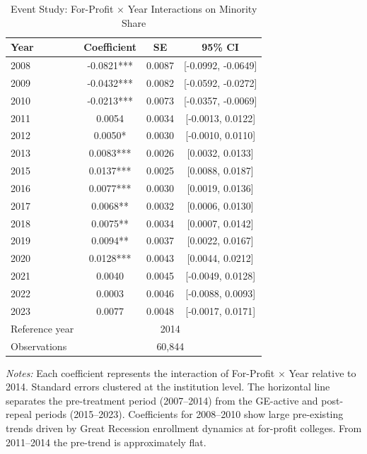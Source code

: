 \begin{table}[H]
\centering
\caption{Event Study: For-Profit $\times$ Year Interactions on Minority Share}
\label{tab:event}
\begin{threeparttable}
\begin{tabular}{lccc}
\toprule
Year & Coefficient & SE & 95\% CI \\
\midrule
2008 & -0.0821*** & 0.0087 & [-0.0992, -0.0649] \\
2009 & -0.0432*** & 0.0082 & [-0.0592, -0.0272] \\
2010 & -0.0213*** & 0.0073 & [-0.0357, -0.0069] \\
2011 & 0.0054 & 0.0034 & [-0.0013, 0.0122] \\
2012 & 0.0050* & 0.0030 & [-0.0010, 0.0110] \\
2013 & 0.0083*** & 0.0026 & [0.0032, 0.0133] \\
2015 & 0.0137*** & 0.0025 & [0.0088, 0.0187] \\ \hline
2016 & 0.0077*** & 0.0030 & [0.0019, 0.0136] \\
2017 & 0.0068** & 0.0032 & [0.0006, 0.0130] \\
2018 & 0.0075** & 0.0034 & [0.0007, 0.0142] \\
2019 & 0.0094** & 0.0037 & [0.0022, 0.0167] \\
2020 & 0.0128*** & 0.0043 & [0.0044, 0.0212] \\
2021 & 0.0040 & 0.0045 & [-0.0049, 0.0128] \\
2022 & 0.0003 & 0.0046 & [-0.0088, 0.0093] \\
2023 & 0.0077 & 0.0048 & [-0.0017, 0.0171] \\
\midrule
Reference year & \multicolumn{3}{c}{2014} \\
Observations & \multicolumn{3}{c}{60,844} \\
\bottomrule
\end{tabular}
\begin{tablenotes}[flushleft]
\small
\item \textit{Notes:} Each coefficient represents the interaction of For-Profit $\times$ Year relative to 2014. Standard errors clustered at the institution level. The horizontal line separates the pre-treatment period (2007--2014) from the GE-active and post-repeal periods (2015--2023). Coefficients for 2008--2010 show large pre-existing trends driven by Great Recession enrollment dynamics at for-profit colleges. From 2011--2014 the pre-trend is approximately flat.
\end{tablenotes}
\end{threeparttable}
\end{table}
